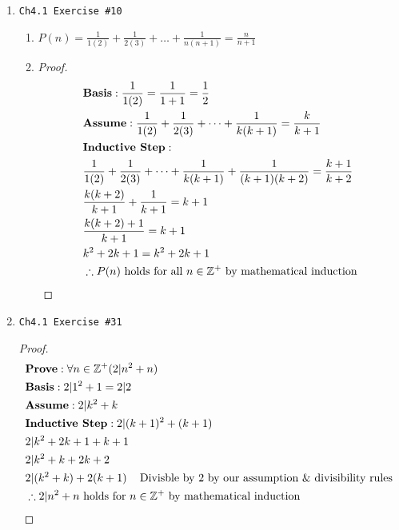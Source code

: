 \documentclass[11pt]{article}
\begin{document}
\begin{enumerate}
    \newpage

    \item \begin{verbatim}Ch4.1 Exercise #10\end{verbatim}
        \begin{enumerate}
            \item $ P(n) = \frac{1}{1(2)} + \frac{1}{2(3)} + \dots + \frac{1}{n(n+1)} = \frac{n}{n+1} $
            \item \begin{proof}
                \begin{align*}
                    & \textbf{Basis}: \frac{1}{1(2)} = \frac{1}{1+1} = \frac{1}{2} \\
                    & \textbf{Assume}:\frac{1}{1(2)} + \frac{1}{2(3)} + \dots + \frac{1}{k(k+1)} = \frac{k}{k+1}\\
                    & \textbf{Inductive Step}: \\
                    & \frac{1}{1(2)} + \frac{1}{2(3)} + \dots + \frac{1}{k(k+1)} + \frac{1}{(k+1)(k+2)} = \frac{k+1}{k+2} \\
                    & \frac{k(k+2)}{k+1} + \frac{1}{k+1} = k+1 \\
                    & \frac{k(k+2)+1}{k+1} = k+1 \\
                    & k^2 + 2k + 1 = k^2 + 2k + 1 \\
                    & \therefore P(n) \text{ holds for all } n \in \mathbb{Z}^+ \text{ by mathematical induction}\qedhere
                \end{align*}
                \end{proof}
        \end{enumerate}

    \item \begin{verbatim}Ch4.1 Exercise #31\end{verbatim}
        \begin{proof}
            \begin{align*}
                & \textbf{Prove}: \forall n \in \mathbb{Z}^+ (2 | n^2 + n) \\
                & \textbf{Basis}: 2 | 1^2 + 1 = 2 | 2 \\
                & \textbf{Assume}: 2 |  k^2 + k \\
                & \textbf{Inductive Step}: 2 | (k+1)^2 + (k + 1) \\
                & 2 | k^2 + 2k + 1 + k + 1 \\
                & 2 | k^2 + k + 2k + 2 \\
                & 2 | (k^2 + k) + 2(k+1) \;\;\;\text{ Divisble by 2 by our assumption \& divisibility rules }\\
                & \therefore 2 | n^2 + n \text{ holds for } n\in\mathbb{Z}^+ \text{ by mathematical induction} \qedhere
            \end{align*}
        \end{proof}


\end{enumerate}
\end{document}
